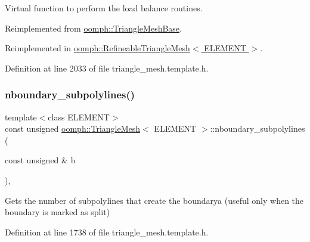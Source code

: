 Virtual function to perform the load balance routines. 



Reimplemented from \hyperlink{classoomph_1_1TriangleMeshBase_ad6e2c45db7c67e5a6fd063f0ea9bbfe7}{oomph\+::\+Triangle\+Mesh\+Base}.



Reimplemented in \hyperlink{classoomph_1_1RefineableTriangleMesh_aaffa40b7d036f8ed8639bf9396f1088a}{oomph\+::\+Refineable\+Triangle\+Mesh$<$ E\+L\+E\+M\+E\+N\+T $>$}.



Definition at line 2033 of file triangle\+\_\+mesh.\+template.\+h.

\mbox{\label{classoomph_1_1TriangleMesh_aa735ba252e89f8dfe6b95a4b19970c25}} 
\subsubsection{\texorpdfstring{nboundary\+\_\+subpolylines()}{nboundary\_subpolylines()}}
{\footnotesize\ttfamily template$<$class E\+L\+E\+M\+E\+NT$>$ \\
const unsigned \hyperlink{classoomph_1_1TriangleMesh}{oomph\+::\+Triangle\+Mesh}$<$ E\+L\+E\+M\+E\+NT $>$\+::nboundary\+\_\+subpolylines (\begin{DoxyParamCaption}\item[{const unsigned \&}]{b }\end{DoxyParamCaption})\hspace{0.3cm}{\ttfamily [inline]}, {\ttfamily [protected]}}



Gets the number of subpolylines that create the boundarya (useful only when the boundary is marked as split) 



Definition at line 1738 of file triangle\+\_\+mesh.\+template.\+h.

\mbox{\label{classoomph_1_1TriangleMesh_a6f6f502f1ff32f126db888b621fcdb0b}} 
